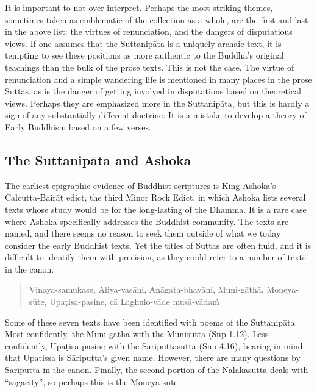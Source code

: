 \documentclass[12pt,openany]{book}%
\begin{document}
It is important to not over-interpret. Perhaps the most striking themes, sometimes taken as emblematic of the collection as a whole, are the first and last in the above list: the virtues of renunciation, and the dangers of disputatious views. If one assumes that the \textsanskrit{Suttanipāta} is a uniquely archaic text, it is tempting to see these positions as more authentic to the Buddha’s original teachings than the bulk of the prose texts. This is not the case. The virtue of renunciation and a simple wandering life is mentioned in many places in the prose Suttas, as is the danger of getting involved in disputations based on theoretical views. Perhaps they are emphasized more in the \textsanskrit{Suttanipāta}, but this is hardly a sign of any substantially different doctrine. It is a mistake to develop a theory of Early Buddhism based on a few verses.

\subsection*{The \textsanskrit{Suttanipāta} and Ashoka}

The earliest epigraphic evidence of Buddhist scriptures is King Ashoka’s Calcutta-\textsanskrit{Bairāṭ} edict, the third Minor Rock Edict, in which Ashoka lists several texts whose study would be for the long-lasting of the Dhamma. It is a rare case where Ashoka specifically addresses the Buddhist community. The texts are named, and there seems no reason to seek them outside of what we today consider the early Buddhist texts. Yet the titles of Suttas are often fluid, and it is difficult to identify them with precision, as they could refer to a number of texts in the canon.

\begin{quotation}%
Vinaya-samukase, Aliya-\textsanskrit{vasāṇi}, \textsanskrit{Anāgata}-\textsanskrit{bhayāni}, Muni-\textsanskrit{gāthā}, Moneya-\textsanskrit{sūte}, \textsanskrit{Upaṭisa}-pasine, \textsanskrit{cā} Laghulo-\textsanskrit{vāde} \textsanskrit{musā}-\textsanskrit{vādaṁ}

%
\end{quotation}

Some of these seven texts have been identified with poems of the \textsanskrit{Suttanipāta}. Most confidently, the Muni-\textsanskrit{gāthā} with the Munisutta (Snp 1.12). Less confidently, \textsanskrit{Upaṭisa}-pasine with the \textsanskrit{Sāriputtasutta} (Snp 4.16), bearing in mind that Upatissa is \textsanskrit{Sāriputta}’s given name. However, there are many questions by \textsanskrit{Sāriputta} in the canon. Finally, the second portion of the \textsanskrit{Nālakasutta} deals with “sagacity”, so perhaps this is the Moneya-\textsanskrit{sūte}.
\end{document}
